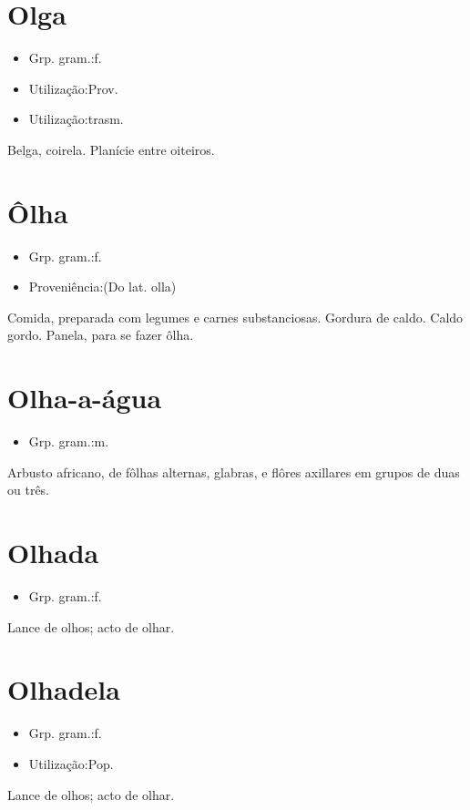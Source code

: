 \section{Olga}
\begin{itemize}
\item {Grp. gram.:f.}
\end{itemize}
\begin{itemize}
\item {Utilização:Prov.}
\end{itemize}
\begin{itemize}
\item {Utilização:trasm.}
\end{itemize}
Belga, coirela.
Planície entre oiteiros.
\section{Ôlha}
\begin{itemize}
\item {Grp. gram.:f.}
\end{itemize}
\begin{itemize}
\item {Proveniência:(Do lat. \textunderscore olla\textunderscore )}
\end{itemize}
Comida, preparada com legumes e carnes substanciosas.
Gordura de caldo.
Caldo gordo.
Panela, para se fazer ôlha.
\section{Olha-a-água}
\begin{itemize}
\item {Grp. gram.:m.}
\end{itemize}
Arbusto africano, de fôlhas alternas, glabras, e flôres axillares em grupos de duas ou três.
\section{Olhada}
\begin{itemize}
\item {Grp. gram.:f.}
\end{itemize}
Lance de olhos; acto de olhar.
\section{Olhadela}
\begin{itemize}
\item {Grp. gram.:f.}
\end{itemize}
\begin{itemize}
\item {Utilização:Pop.}
\end{itemize}
Lance de olhos; acto de olhar.
